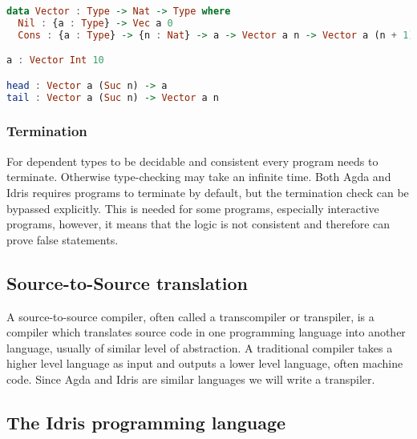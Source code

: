 \documentclass[parskip=half]{scrartcl}
\begin{document}

\begin{lstlisting}[language=Haskell]
data Vector : Type -> Nat -> Type where
  Nil : {a : Type} -> Vec a 0
  Cons : {a : Type} -> {n : Nat} -> a -> Vector a n -> Vector a (n + 1)

a : Vector Int 10

head : Vector a (Suc n) -> a
tail : Vector a (Suc n) -> Vector a n
\end{lstlisting}



\subsubsection{Termination}

For dependent types to be decidable and consistent every program needs to
terminate. Otherwise type-checking may take an infinite time.  Both Agda and
Idris requires programs to terminate by default, but the termination check can
be bypassed explicitly. This is needed for some programs, especially
interactive programs, however, it means that the logic is not consistent and
therefore can prove false statements.

\subsection{Source-to-Source translation}

A source-to-source compiler, often called a transcompiler or transpiler, is
a compiler which translates source code in one programming language into
another language, usually of similar level of abstraction. A traditional
compiler takes a higher level language as input and outputs a lower level
language, often machine code.  Since Agda and Idris are similar languages we will write a transpiler.


\subsection{The Idris programming language}
\end{document}
